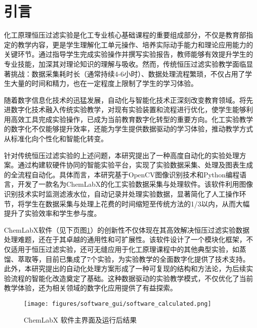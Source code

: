 
\wuhao                      %
\rmfamily                   %


\section{引言}

化工原理恒压过滤实验是化工专业核心基础课程的重要组成部分，不仅是教育部指定的教学内容，更是学生理解化工单元操作、培养实际动手能力和理论应用能力的关键环节。通过指导学生完成实验操作并撰写实验报告，教师能够有效提升学生的专业技能，加深其对理论知识的理解与吸收。然而，传统恒压过滤实验教学面临显著挑战：数据采集耗时长（通常持续4-6小时）、数据处理流程繁琐，不仅占用了学生大量的时间和精力，也在一定程度上限制了学生的学习体验。

随着数字信息化技术的迅猛发展，自动化与智能化技术正深刻改变教育领域\textsuperscript{\cite{ref1}}。将先进数字化技术融入传统实验教学，对现有实验装置和流程进行优化，使学生能够利用高效工具完成实验操作，已成为当前教育数字化转型的重要方向。化工实验教学的数字化不仅能够提升效率，还能为学生提供数据驱动的学习体验，推动教学方式从标准化向个性化和智能化转变。

针对传统恒压过滤实验\textsuperscript{\cite{ref2,ref3}}的上述问题，本研究提出了一种高度自动化的实验处理方案。通过构建软硬件协同的智能实验平台，实现了实验数据采集、处理及图表生成的全流程自动化。具体而言，本研究基于OpenCV图像识别技术和Python编程语言，开发了一款名为ChemLabX的化工实验数据采集与处理软件。该软件利用图像识别技术实时监测滤液水位，自动记录并处理实验数据，显著简化了人工操作环节，将学生在数据采集与处理上花费的时间缩短至传统方法的1/3以内，从而大幅提升了实验效率和学生参与度。

ChemLabX软件（见下页图\ref{fig:software_calculated}）的创新性不仅体现在其高效解决恒压过滤实验数据处理难题，还在于其卓越的通用性和可扩展性。该软件设计了一个模块化框架，不仅适用于恒压过滤实验，还可无缝应用于化工原理课程中的其他典型实验，如蒸馏、萃取等，目前已集成了7个实验，为实验教学的全面数字化提供了技术支持。此外，本研究提出的自动化处理方案形成了一种可复现的结构和方法论，为后续实验流程的智能化改造奠定了基础。这种数据驱动的实验教学模式，不仅优化了当前教学体验，还为相关领域的数字化应用提供了有益探索。

\begin{figure}[H]
\centering
\texttt{[image: figures/software\_gui/software\_calculated.png]}
\caption{ChemLabX 软件主界面及运行后结果}
\label{fig:software_calculated}
\end{figure}

